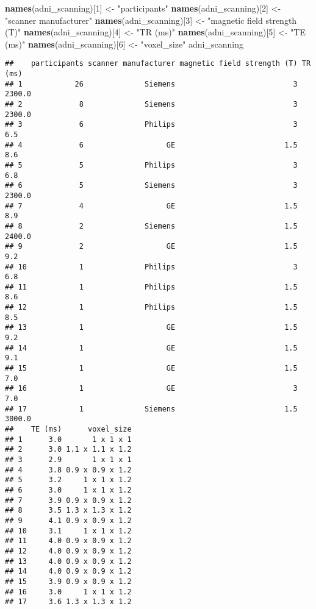 \documentclass[
]{article}
\newenvironment{Shaded}{\begin{snugshade}}{\end{snugshade}}
\newcommand{\DecValTok}[1]{\textcolor[rgb]{0.00,0.00,0.81}{#1}}
\newcommand{\KeywordTok}[1]{\textcolor[rgb]{0.13,0.29,0.53}{\textbf{#1}}}
\newcommand{\NormalTok}[1]{#1}
\newcommand{\StringTok}[1]{\textcolor[rgb]{0.31,0.60,0.02}{#1}}
\begin{document}
\begin{Shaded}
\begin{Highlighting}[]
\KeywordTok{names}\NormalTok{(adni_scanning)[}\DecValTok{1}\NormalTok{] <-}\StringTok{ "participants"}
\KeywordTok{names}\NormalTok{(adni_scanning)[}\DecValTok{2}\NormalTok{] <-}\StringTok{ "scanner manufacturer"}
\KeywordTok{names}\NormalTok{(adni_scanning)[}\DecValTok{3}\NormalTok{] <-}\StringTok{ "magnetic field strength (T)"}
\KeywordTok{names}\NormalTok{(adni_scanning)[}\DecValTok{4}\NormalTok{] <-}\StringTok{ "TR (ms)"}
\KeywordTok{names}\NormalTok{(adni_scanning)[}\DecValTok{5}\NormalTok{] <-}\StringTok{ "TE (ms)"}
\KeywordTok{names}\NormalTok{(adni_scanning)[}\DecValTok{6}\NormalTok{] <-}\StringTok{ "voxel_size"}
\NormalTok{adni_scanning}
\end{Highlighting}
\end{Shaded}

\begin{verbatim}
##    participants scanner manufacturer magnetic field strength (T) TR (ms)
## 1            26              Siemens                           3  2300.0
## 2             8              Siemens                           3  2300.0
## 3             6              Philips                           3     6.5
## 4             6                   GE                         1.5     8.6
## 5             5              Philips                           3     6.8
## 6             5              Siemens                           3  2300.0
## 7             4                   GE                         1.5     8.9
## 8             2              Siemens                         1.5  2400.0
## 9             2                   GE                         1.5     9.2
## 10            1              Philips                           3     6.8
## 11            1              Philips                         1.5     8.6
## 12            1              Philips                         1.5     8.5
## 13            1                   GE                         1.5     9.2
## 14            1                   GE                         1.5     9.1
## 15            1                   GE                         1.5     7.0
## 16            1                   GE                           3     7.0
## 17            1              Siemens                         1.5  3000.0
##    TE (ms)      voxel_size
## 1      3.0       1 x 1 x 1
## 2      3.0 1.1 x 1.1 x 1.2
## 3      2.9       1 x 1 x 1
## 4      3.8 0.9 x 0.9 x 1.2
## 5      3.2     1 x 1 x 1.2
## 6      3.0     1 x 1 x 1.2
## 7      3.9 0.9 x 0.9 x 1.2
## 8      3.5 1.3 x 1.3 x 1.2
## 9      4.1 0.9 x 0.9 x 1.2
## 10     3.1     1 x 1 x 1.2
## 11     4.0 0.9 x 0.9 x 1.2
## 12     4.0 0.9 x 0.9 x 1.2
## 13     4.0 0.9 x 0.9 x 1.2
## 14     4.0 0.9 x 0.9 x 1.2
## 15     3.9 0.9 x 0.9 x 1.2
## 16     3.0     1 x 1 x 1.2
## 17     3.6 1.3 x 1.3 x 1.2
\end{verbatim}
\end{document}

